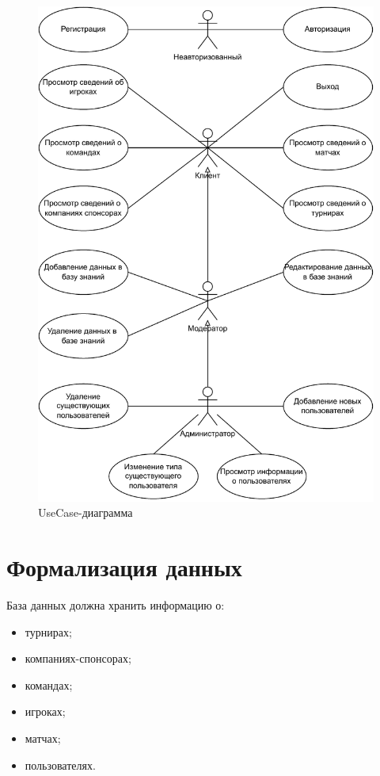 \begin{figure}[h!btp]
	\centering	\includegraphics[width=450pt]{inc/diag/use_case.pdf}
	\caption{UseCase-диаграмма}
	\label{fig:use_case}	
\end{figure}

\newpage

\section{Формализация данных}

База данных должна хранить информацию о: 
\begin{itemize}
	\item турнирах;
	\item компаниях-спонсорах;
	\item командах;
	\item игроках;
	\item матчах;
	\item пользователях.
\end{itemize}

